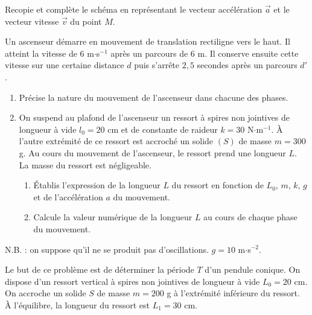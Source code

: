 \documentclass[11pt]{article}
\begin{document}
\noindent Recopie et complète le schéma en représentant le vecteur accélération $\vec{a}$ et le vecteur vitesse $\vec{v}$ du point $M$.

Un ascenseur démarre en mouvement de translation rectiligne vers le haut. Il atteint la vitesse de 6 m$\cdot$s$^{-1}$ après un parcours de 6 m. Il conserve ensuite cette vitesse sur une certaine distance $d$ puis s'arrête $2{,}5$ secondes après un parcours $d'$.

\begin{enumerate}
  \item Précise la nature du mouvement de l'ascenseur dans chacune des phases.
  \item On suspend au plafond de l'ascenseur un ressort à spires non jointives de longueur à vide $l_0 = 20$ cm et de constante de raideur $k = 30$ N$\cdot$m$^{-1}$. À l'autre extrémité de ce ressort est accroché un solide $(S)$ de masse $m = 300$ g. Au cours du mouvement de l'ascenseur, le ressort prend une longueur $L$. La masse du ressort est négligeable.
  \begin{enumerate}[label=\alph*.]
    \item Établis l'expression de la longueur $L$ du ressort en fonction de $L_0$, $m$, $k$, $g$ et de l'accélération $a$ du mouvement.
    \item Calcule la valeur numérique de la longueur $L$ au cours de chaque phase du mouvement.
  \end{enumerate}
\end{enumerate}
\noindent N.B. : on suppose qu'il ne se produit pas d'oscillations. $g = 10$ m$\cdot$s$^{-2}$.

Le but de ce problème est de déterminer la période $T$ d'un pendule conique. On dispose d'un ressort vertical à spires non jointives de longueur à vide $L_0 = 20$ cm. On accroche un solide $S$ de masse $m = 200$ g à l'extrémité inférieure du ressort. À l'équilibre, la longueur du ressort est $L_1 = 30$ cm.
\end{document}
